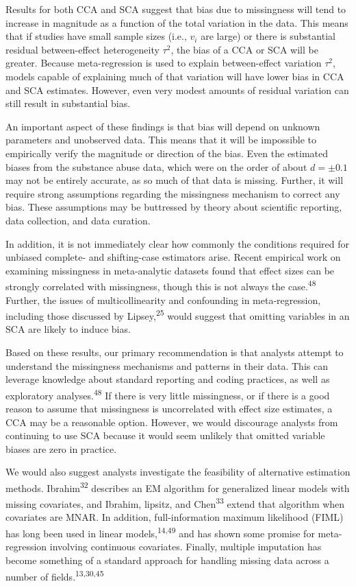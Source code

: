 \documentclass[
]{article}
\begin{document}
Results for both CCA and SCA suggest that bias due to missingness will tend to increase in magnitude as a function of the total variation in the data.
This means that if studies have small sample sizes (i.e., \(v_i\) are large) or there is substantial residual between-effect heterogeneity \(\tau^2\), the bias of a CCA or SCA will be greater.
Because meta-regression is used to explain between-effect variation \(\tau^2\), models capable of explaining much of that variation will have lower bias in CCA and SCA estimates.
However, even very modest amounts of residual variation can still result in substantial bias.

An important aspect of these findings is that bias will depend on unknown parameters and unobserved data.
This means that it will be impossible to empirically verify the magnitude or direction of the bias.
Even the estimated biases from the substance abuse data, which were on the order of about \(d = \pm 0.1\) may not be entirely accurate, as so much of that data is missing.
Further, it will require strong assumptions regarding the missingness mechanism to correct any bias.
These assumptions may be buttressed by theory about scientific reporting, data collection, and data curation.

In addition, it is not immediately clear how commonly the conditions required for unbiased complete- and shifting-case estimators arise.
Recent empirical work on examining missingness in meta-analytic datasets found that effect sizes can be strongly correlated with missingness, though this is not always the case.\textsuperscript{48}
Further, the issues of multicollinearity and confounding in meta-regression, including those discussed by Lipsey,\textsuperscript{25} would suggest that omitting variables in an SCA are likely to induce bias.

Based on these results, our primary recommendation is that analysts attempt to understand the missingness mechanisms and patterns in their data.
This can leverage knowledge about standard reporting and coding practices, as well as exploratory analyses.\textsuperscript{48}
If there is very little missingness, or if there is a good reason to assume that missingness is uncorrelated with effect size estimates, a CCA may be a reasonable option.
However, we would discourage analysts from continuing to use SCA because it would seem unlikely that omitted variable biases are zero in practice.

We would also suggest analysts investigate the feasibility of alternative estimation methods. Ibrahim\textsuperscript{32} describes an EM algorithm for generalized linear models with missing covariates, and Ibrahim, lipsitz, and Chen\textsuperscript{33} extend that algorithm when covariates are MNAR.
In addition, full-information maximum likelihood (FIML) has long been used in linear models,\textsuperscript{14,49} and has shown some promise for meta-regression involving continuous covariates.
Finally, multiple imputation has become something of a standard approach for handling missing data across a number of fields.\textsuperscript{13,30,45}
\end{document}
